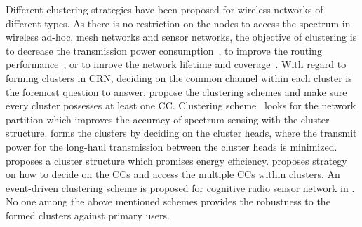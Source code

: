 \documentclass[times]{ettauth}
\theoremstyle{mytheoremstyle}
\theoremstyle{mytheoremstyle}
\theoremstyle{mytheoremstyle}
\begin{document}
Different clustering strategies have been proposed for wireless networks of different types.
As there is no restriction on the nodes to access the spectrum in wireless ad-hoc, mesh networks and sensor networks, the objective of clustering is to decrease the transmission power consumption~\cite{Kawadia03}, to improve the routing performance~\cite{clustering_mesh_globecom2010}, or to imrove the network lifetime and coverage~\cite{Abbasi_survey_07}.
With regard to forming clusters in CRN, deciding on the common channel within each cluster is the foremost question to answer.
\cite{Zhao07, Chen07,Affinity_clustering_09icccn} propose the clustering schemes and make sure every cluster possesses at least one CC.
Clustering scheme~\cite{Consensus_based_clustering12} looks for the network partition which improves the accuracy of spectrum sensing with the cluster structure.
\cite{TWC2012_cooperative_communication} forms the clusters by deciding on the cluster heads, where the transmit power for the long-haul transmission between the cluster heads is minimized.
\cite{clustering_globecom11} proposes a cluster structure which promises energy efficiency.
\cite{cluster_EW10} proposes strategy on how to decide on the CCs and access the multiple CCs within clusters.
An event-driven clustering scheme is proposed for cognitive radio sensor network in \cite{Ozger_cluster_crsn_13}.
No one among the above mentioned schemes provides the robustness to the formed clusters against primary users. 
\end{document}
